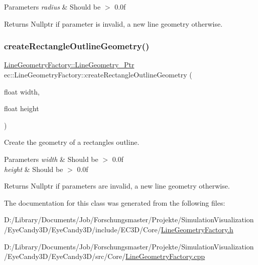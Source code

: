 \begin{DoxyParams}{Parameters}
{\em radius} & Should be $>$ 0.\+0f \\
\hline
\end{DoxyParams}
\begin{DoxyReturn}{Returns}
Nullptr if parameter is invalid, a new line geometry otherwise. 
\end{DoxyReturn}
\mbox{\label{classec_1_1_line_geometry_factory_ad5a4cbba96cb7d6fa979e6266c7a8912}} 
\subsubsection{\texorpdfstring{create\+Rectangle\+Outline\+Geometry()}{createRectangleOutlineGeometry()}}
{\footnotesize\ttfamily \mbox{\hyperlink{classec_1_1_line_geometry_factory_a8f7bd7480ebc0dbc77930d81dcb69678}{Line\+Geometry\+Factory\+::\+Line\+Geometry\+\_\+\+Ptr}} ec\+::\+Line\+Geometry\+Factory\+::create\+Rectangle\+Outline\+Geometry (\begin{DoxyParamCaption}\item[{float}]{width,  }\item[{float}]{height }\end{DoxyParamCaption})\hspace{0.3cm}{\ttfamily [static]}}



Create the geometry of a rectangle\textquotesingle{}s outline. 


\begin{DoxyParams}{Parameters}
{\em width} & Should be $>$ 0.\+0f \\
\hline
{\em height} & Should be $>$ 0.\+0f \\
\hline
\end{DoxyParams}
\begin{DoxyReturn}{Returns}
Nullptr if parameters are invalid, a new line geometry otherwise. 
\end{DoxyReturn}


The documentation for this class was generated from the following files\+:\begin{DoxyCompactItemize}
\item 
D\+:/\+Library/\+Documents/\+Job/\+Forschungsmaster/\+Projekte/\+Simulation\+Visualization/\+Eye\+Candy3\+D/\+Eye\+Candy3\+D/include/\+E\+C3\+D/\+Core/\mbox{\hyperlink{_line_geometry_factory_8h}{Line\+Geometry\+Factory.\+h}}\item 
D\+:/\+Library/\+Documents/\+Job/\+Forschungsmaster/\+Projekte/\+Simulation\+Visualization/\+Eye\+Candy3\+D/\+Eye\+Candy3\+D/src/\+Core/\mbox{\hyperlink{_line_geometry_factory_8cpp}{Line\+Geometry\+Factory.\+cpp}}\end{DoxyCompactItemize}
